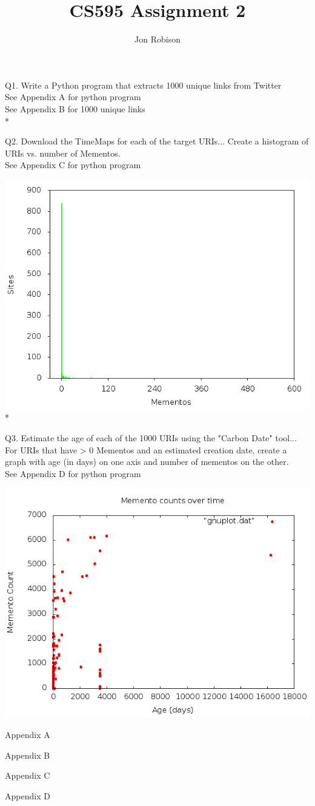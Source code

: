 \documentclass{article}
\begin{document}
\author{Jon Robison}
\title{CS595 Assignment 2}
\maketitle

Q1. Write a Python program that extracts 1000 unique links from Twitter \\
See Appendix A for python program \\
See Appendix B for 1000 unique links
\\*

Q2. Download the TimeMaps for each of the target URIs... Create a histogram of
URIs vs. number of Mementos. \\
See Appendix C for python program \\
\graphicspath{{q2/}}
\includegraphics[scale=.4]{histogram.png}
\\*

Q3. Estimate the age of each of the 1000 URIs using the "Carbon Date" tool...
For URIs that have > 0 Mementos and an estimated creation date, create a graph
with age (in days) on one axis and number of mementos on the other. \\
See Appendix D for python program \\
\graphicspath{{q3/}}
\includegraphics[scale=.4]{ageMementoCount.png}

\newpage
\appendix
Appendix A
%

\newpage
Appendix B
%

\newpage
Appendix C
%

\newpage
Appendix D
%
\end{document}
